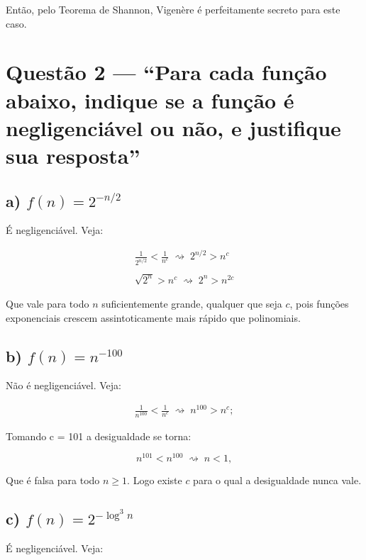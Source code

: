 \documentclass[11pt,a4paper]{article}
\begin{document}
Então, pelo Teorema de Shannon, Vigenère é perfeitamente secreto para este caso.

\clearpage
\section*{Questão 2 --- ``Para cada função abaixo, indique se a função é
negligenciável ou não, e justifique sua resposta''}

\subsection*{a) $f(n) = 2^{-n/2}$}

É negligenciável. Veja:

\begin{gather*}
    \frac{1}{2^{n/2}} < \frac{1}{n^{c}} \;\rightsquigarrow\; 2^{n/2} > n^{c} \\ \\
    \sqrt{2^{n}} > n^{c} \;\rightsquigarrow\; 2^{n} > n^{2c}
\end{gather*}

Que vale para todo $n$ suficientemente grande, qualquer que seja $c$, pois funções exponenciais
crescem assintoticamente mais rápido que polinomiais.

\subsection*{b) $f(n) = n^{-100}$}

Não é negligenciável. Veja:

\begin{gather*}
    \frac{1}{n^{100}} < \frac{1}{n^{c}} \;\rightsquigarrow\; n^{100} > n^{c};
\end{gather*}

Tomando c = 101 a desigualdade se torna:

\[
    n^{101} < n^{100}
    \;\rightsquigarrow\; n < 1,
\]

Que é falsa para todo $n \geq 1$.
Logo existe $c$ para o qual a desigualdade nunca vale.

\subsection*{c) $f(n) = 2^{-\log^{3} n}$}

É negligenciável. Veja:
\end{document}
